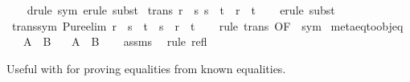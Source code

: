 \begin{isabellebody}
%
\isadelimproof
\ \ %
\endisadelimproof
%
\isatagproof
{}\isamarkupfalse%
\ {\isacharparenleft}{\kern0pt}drule\ sym{\isacharparenright}{\kern0pt}\ {\isacharparenleft}{\kern0pt}erule\ subst{\isacharparenright}{\kern0pt}%
\endisatagproof
{\isafoldproof}%
%
\isadelimproof
\isanewline
%
\endisadelimproof
\isanewline
{}\isamarkupfalse%
\ trans{\isacharcolon}{\kern0pt}\ {\isachardoublequoteopen}{\isasymlbrakk}r\ {\isacharequal}{\kern0pt}\ s{\isacharsemicolon}{\kern0pt}\ s\ {\isacharequal}{\kern0pt}\ t{\isasymrbrakk}\ {\isasymLongrightarrow}\ r\ {\isacharequal}{\kern0pt}\ t{\isachardoublequoteclose}\isanewline
%
\isadelimproof
\ \ %
\endisadelimproof
%
\isatagproof
{}\isamarkupfalse%
\ {\isacharparenleft}{\kern0pt}erule\ subst{\isacharparenright}{\kern0pt}%
\endisatagproof
{\isafoldproof}%
%
\isadelimproof
\isanewline
%
\endisadelimproof
\isanewline
{}\isamarkupfalse%
\ trans{\isacharunderscore}{\kern0pt}sym\ {\isacharbrackleft}{\kern0pt}Pure{\isachardot}{\kern0pt}elim{\isacharquery}{\kern0pt}{\isacharbrackright}{\kern0pt}{\isacharcolon}{\kern0pt}\ {\isachardoublequoteopen}r\ {\isacharequal}{\kern0pt}\ s\ {\isasymLongrightarrow}\ t\ {\isacharequal}{\kern0pt}\ s\ {\isasymLongrightarrow}\ r\ {\isacharequal}{\kern0pt}\ t{\isachardoublequoteclose}\isanewline
%
\isadelimproof
\ \ %
\endisadelimproof
%
\isatagproof
{}\isamarkupfalse%
\ {\isacharparenleft}{\kern0pt}rule\ trans\ {\isacharbrackleft}{\kern0pt}OF\ {\isacharunderscore}{\kern0pt}\ sym{\isacharbrackright}{\kern0pt}{\isacharparenright}{\kern0pt}%
\endisatagproof
{\isafoldproof}%
%
\isadelimproof
\isanewline
%
\endisadelimproof
\isanewline
{}\isamarkupfalse%
\ meta{\isacharunderscore}{\kern0pt}eq{\isacharunderscore}{\kern0pt}to{\isacharunderscore}{\kern0pt}obj{\isacharunderscore}{\kern0pt}eq{\isacharcolon}{\kern0pt}\isanewline
\ \ \ {\isachardoublequoteopen}A\ {\isasymequiv}\ B{\isachardoublequoteclose}\isanewline
\ \ \ {\isachardoublequoteopen}A\ {\isacharequal}{\kern0pt}\ B{\isachardoublequoteclose}\isanewline
%
\isadelimproof
\ \ %
\endisadelimproof
%
\isatagproof
{}\isamarkupfalse%
\ assms\ \isamarkupfalse%
\ {\isacharparenleft}{\kern0pt}rule\ refl{\isacharparenright}{\kern0pt}%
\endisatagproof
{\isafoldproof}%
%
\isadelimproof
%
\endisadelimproof
%
\begin{isamarkuptext}%
Useful with  for proving equalities from known equalities.%
\end{isamarkuptext}\isamarkuptrue%

\end{isabellebody}
